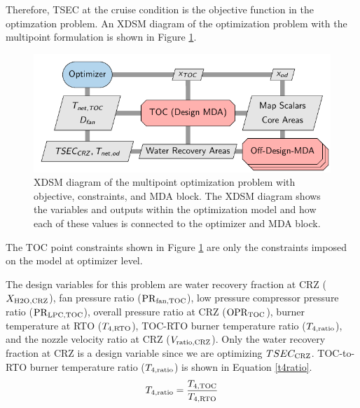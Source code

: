 \documentclass[conf]{new-aiaa}
\begin{document}
Therefore, TSEC at the cruise condition is the objective function in the optimzation problem.
An XDSM diagram of the optimization problem with the multipoint formulation is shown in Figure \ref{fig:N3_opt_xdsm}.

\begin{figure}[!hbt]
    \centering
    \includegraphics[width=1.0\textwidth]{N3_opt_XDSM.pdf}
    \caption{
        XDSM diagram of the multipoint optimization problem with objective, constraints, and MDA block.
        The XDSM diagram shows the variables and outputs within the optimization model and how each of these values is connected to the optimizer and MDA block.}
    \label{fig:N3_opt_xdsm}
\end{figure}

The TOC point constraints shown in Figure \ref{fig:N3_opt_xdsm} are only the constraints imposed on the model at optimizer level.


The design variables for this problem are water recovery fraction at CRZ ($X_{\rm{H2O,CRZ}}$), fan pressure ratio ($\rm{PR}_{\rm{fan,TOC}}$), low pressure compressor pressure ratio ($\rm{PR}_{\rm{LPC,TOC}}$), overall pressure ratio at CRZ ($\rm{OPR}_{\rm{TOC}}$), burner temperature at RTO ($T_{4,\rm{RTO}}$), TOC-RTO burner temperature ratio ($T_{4,\rm{ratio}}$), and the nozzle velocity ratio at CRZ ($V_{\rm{ratio,CRZ}}$).
Only the water recovery fraction at CRZ is a design variable since we are optimizing $TSEC_{\rm{CRZ}}$.
TOC-to-RTO burner temperature ratio ($T_{4,\rm{ratio}}$) is shown in Equation \eqref{t4ratio}.
\begin{equation}
    T_{4,\rm{ratio}} = \frac{T_{4,\rm{TOC}}}{T_{4,\rm{RTO}}}
    \label{t4ratio}
\end{equation}
\end{document}
